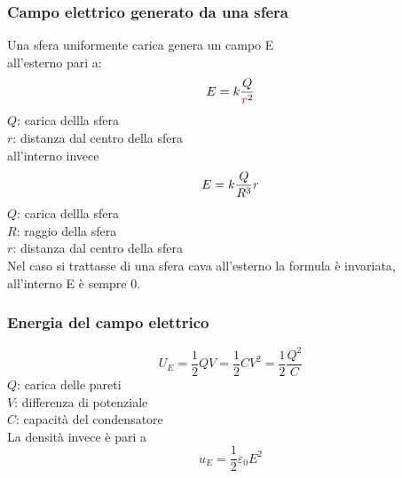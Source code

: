 \subsubsection{Campo elettrico generato da una sfera}
\begin{center}
\end{center}
Una sfera uniformente carica genera un campo E \\ all'esterno pari a:
\begin{equation*}
  E=k\frac{Q}{\textcolor{red}{r^{\textcolor{black}{2}}}}
\end{equation*}
$Q$: carica dellla sfera\\
$r$: distanza dal centro della sfera\\ [\baselineskip]
all'interno invece
\begin{equation*}
  E=k\frac{Q}{R^{3}}\textcolor{blue}{r}
\end{equation*}
$Q$: carica dellla sfera\\
$R$: raggio della sfera\\
$r$: distanza dal centro della sfera\\ [\baselineskip]
Nel caso si trattasse di una sfera cava all'esterno la formula è invariata, all'interno E è sempre 
0.

\subsubsection{Energia del campo elettrico}
\begin{equation*}
  U_E = \frac{1}{2}QV = \frac{1}{2}CV^2 = \frac{1}{2}\frac{Q^2}{C}
\end{equation*}
$Q$: carica delle pareti\\
$V$: differenza di potenziale\\
$C$: capacità del condensatore\\ [\baselineskip]

La densità invece è pari a
\begin{equation*}
  u_E = \frac{1}{2}\varepsilon_0E^2
\end{equation*}

